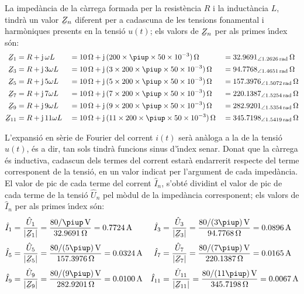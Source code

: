 \begin{exemple}
La imped\`{a}ncia de la c\`{a}rrega formada per la resist\`{e}ncia $R$ i la
induct\`{a}ncia $L$, tindr\`{a} un valor $\cmplx{Z}_n$ diferent per a
cadascuna de les tensions fonamental i harm\`{o}niques presents en la
tensi\'{o} $u(t)$; els valors de $\cmplx{Z}_n$ per als primes \'{\i}ndex s\'{o}n:
\begin{alignat*}{3}
    \cmplx{Z}_1 &= R + \ju\, \omega L &&= \SI{10}{\ohm} + \ju\, (200\times \piup\times 50\times 10^{-3})\unit{\ohm} &&=
    \SIpr{32,9691}{1,2626}{\ohm}\\
    \cmplx{Z}_3 &= R + \ju\, 3 \omega L &&= \SI{10}{\ohm} + \ju\, (3\times 200\times \piup\times 50\times 10^{-3})\unit{\ohm} &&=
    \SIpr{94,7768}{1,4651}{\ohm}\\
    \cmplx{Z}_5 &= R + \ju\, 5 \omega L &&= \SI{10}{\ohm} + \ju\, (5\times 200\times \piup\times 50\times 10^{-3})\unit{\ohm} &&=
    \SIpr{157,3976}{1,5072}{\ohm}\\
    \cmplx{Z}_7 &= R + \ju\, 7 \omega L &&= \SI{10}{\ohm} + \ju\, (7\times 200\times \piup\times 50\times 10^{-3})\unit{\ohm} &&=
    \SIpr{220,1387}{1,5254}{\ohm}\\
    \cmplx{Z}_9 &= R + \ju\, 9 \omega L &&= \SI{10}{\ohm} + \ju\, (9\times 200\times \piup\times 50\times 10^{-3})\unit{\ohm} &&=
    \SIpr{282,9201}{1,5354}{\ohm}\\
    \cmplx{Z}_{11} &= R + \ju\, 11 \omega L &&= \SI{10}{\ohm} + \ju\, (11\times 200\times \piup\times 50\times 10^{-3})\unit{\ohm} &&=
    \SIpr{345,7198}{1,5419}{\ohm}
\end{alignat*}

L'expansi\'{o} en s\`{e}rie de Fourier del corrent $i(t)$ ser\`{a} an\`{a}loga a la
de la tensi\'{o} $u(t)$, \'{e}s a dir, tan sols tindr\`{a} funcions sinus
d'\'{\i}ndex senar. Donat que la c\`{a}rrega \'{e}s inductiva, cadascun dels
termes del corrent estar\`{a} endarrerit respecte del terme corresponent
de la tensi\'{o}, en un valor indicat per l'argument de cada imped\`{a}ncia.
El valor de pic de cada terme del corrent $\hat{I}_n$, s'obt\'{e}
dividint el valor de pic de cada terme de la tensi\'{o} $\hat{U}_n$ pel
m\`{o}dul de la imped\`{a}ncia corresponent; els valors de $\hat{I}_n$ per
als primes \'{\i}ndex s\'{o}n:
\begin{align*}
    \hat{I}_1 &= \frac{\hat{U}_1}{|\cmplx{Z}_1|} = \frac{80/\piup\unit{V}}{\SI{32,9691}{\ohm}} = \SI{0,7724}{A}
    & \hat{I}_3 &= \frac{\hat{U}_3}{|\cmplx{Z}_3|} =\frac{80/(3\piup)\unit{V}}{\SI{94,7768}{\ohm}} = \SI{0,0896}{A}\\[0.5ex]
    \hat{I}_5 &= \frac{\hat{U}_5}{|\cmplx{Z}_5|} =\frac{80/(5\piup)\unit{V}}{\SI{157,3976}{\ohm}} =\SI{0,0324}{A}
    & \hat{I}_7 &= \frac{\hat{U}_7}{|\cmplx{Z}_7|} =\frac{80/(7\piup)\unit{V}}{\SI{220,1387}{\ohm}} =
    \SI{0,0165}{A}\\[0.5ex]
    \hat{I}_9 &= \frac{\hat{U}_9}{|\cmplx{Z}_9|} =\frac{80/(9\piup)\unit{V}}{\SI{282,9201}{\ohm}} =
    \SI{0,0100}{A} & \hat{I}_{11} &= \frac{\hat{U}_{11}}{|\cmplx{Z}_{11}|} =\frac{80/(11\piup)\unit{V}}
    {\SI{345,7198}{\ohm}} =  \SI{0,0067}{A}
\end{align*}


\end{exemple}
